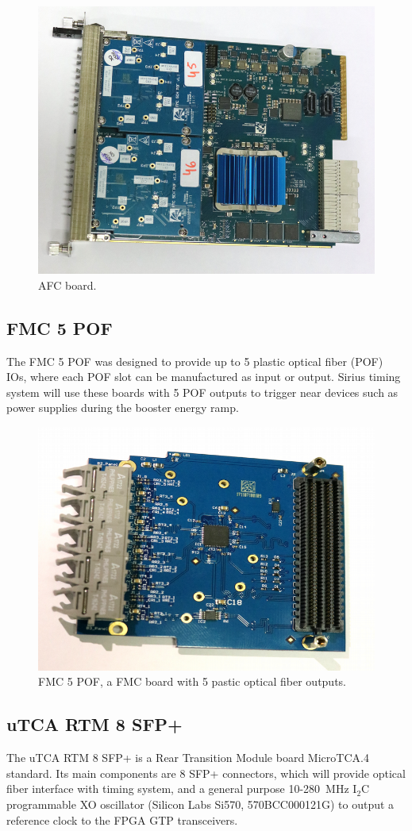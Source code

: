 \documentclass[a4paper,
               biblatex,      %
               ]{jacow}
\begin{document}
\begin{figure}[!htb]
   \centering
   \includegraphics*[width=0.8\columnwidth]{AFC_POFs_resized}
   \caption{AFC board.}
   \label{fig:afc_pofs}
\end{figure}

\subsection{FMC 5 POF}

The FMC 5 POF \cite{fmc-pof-git} was designed to provide up to 5 plastic optical fiber (POF) IOs, where each POF slot can be manufactured as input or output. Sirius timing system will use these boards with 5 POF outputs to trigger near devices such as power supplies during the booster energy ramp.

\begin{figure}[!htb]
   \centering
   \includegraphics*[width=0.5\columnwidth]{FMC_POF_resized}
   \caption{FMC 5 POF, a FMC board with 5 pastic optical fiber outputs.}
   \label{fig:fmc_pof}
\end{figure}

\subsection{uTCA RTM 8 SFP+}
The uTCA RTM 8 SFP+ \cite{rtm-sfp-git} is a Rear Transition Module board MicroTCA.4 standard. Its main components are 8 SFP+ connectors, which will provide optical fiber interface with timing system, and a general purpose 10-280~MHz I$_{2}$C programmable XO oscillator (Silicon Labs Si570, 570BCC000121G) to output a reference clock to the FPGA GTP transceivers. 
\end{document}
